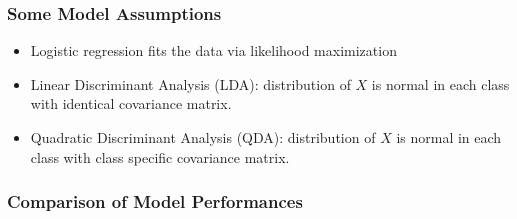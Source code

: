 \documentclass[serif, xcolor={dvipsnames}]{beamer} %
\begin{document}
\begin{frame}
\frametitle{Some Model Assumptions}

\begin{itemize}
\item Logistic regression fits the data via likelihood maximization
\item Linear Discriminant Analysis (LDA): distribution of $X$ is normal in each class with identical covariance matrix.
\item Quadratic Discriminant Analysis (QDA): distribution of $X$ is normal in each class with class specific covariance matrix.
\end{itemize}
\end{frame}

\begin{frame}
\frametitle{Comparison of Model Performances}
\vspace{-.1in}
\begin{figure}[!ht] %
\captionsetup[subfigure]{labelformat=empty}
\centering
{}\\
\vspace{-.35in}
\end{figure}
\end{frame}
\end{document}
